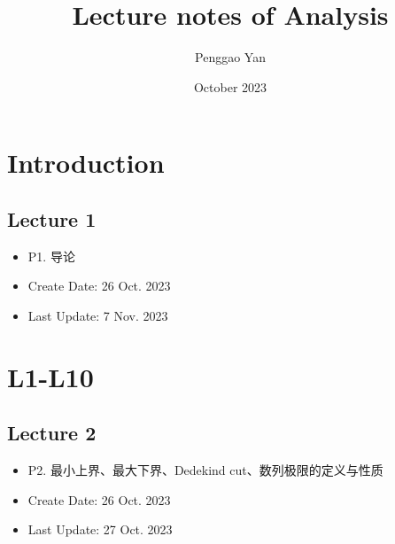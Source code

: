 \documentclass{book}
\title{Lecture notes of Analysis}
\author{Penggao Yan}
\date{October 2023}
\theoremstyle{definition}
\begin{document}
\maketitle


\chapter{Introduction}
\section{Lecture 1}
\begin{itemize}
    \item P1. 导论 
    \item Create Date: 26 Oct. 2023
    \item Last Update: 7 Nov. 2023
\end{itemize}

\chapter{L1-L10}
\section{Lecture 2}
\begin{itemize}
    \item P2. 最小上界、最大下界、Dedekind cut、数列极限的定义与性质 
    \item Create Date: 26 Oct. 2023
    \item Last Update: 27 Oct. 2023
\end{itemize}
\end{document}
